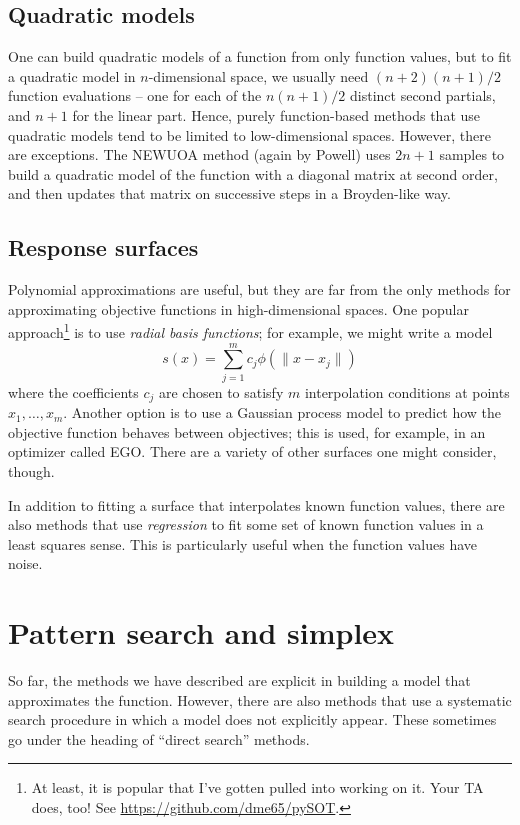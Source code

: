 \documentclass[12pt, leqno]{article} %
\begin{document}
\subsection{Quadratic models}

One can build quadratic models of a function from only function
values, but to fit a quadratic model in $n$-dimensional space, we
usually need $(n+2)(n+1)/2$ function evaluations -- one for each of
the $n(n+1)/2$ distinct second partials, and $n+1$ for the linear
part.  Hence, purely function-based methods that use quadratic models
tend to be limited to low-dimensional spaces.  However, there are
exceptions.  The NEWUOA method (again by Powell) uses $2n+1$ samples
to build a quadratic model of the function with a diagonal matrix at
second order, and then updates that matrix on successive steps in a
Broyden-like way.

\subsection{Response surfaces}

Polynomial approximations are useful, but they are far from the only
methods for approximating objective functions in high-dimensional
spaces.  One popular approach\footnote{%
At least, it is popular that I've gotten pulled into working on it.
Your TA does, too!  See \url{https://github.com/dme65/pySOT}.  
} is to use {\em radial basis functions};
for example, we might write a model
\[
  s(x) = \sum_{j=1}^m c_j \phi(\|x-x_j\|)
\]
where the coefficients $c_j$ are chosen to satisfy $m$ interpolation
conditions at points $x_1, \ldots, x_m$.  Another option is to use
a Gaussian process model to predict how the objective function behaves
between objectives; this is used, for example, in an optimizer called
EGO.  There are a variety of other surfaces one might consider, though.

In addition to fitting a surface that interpolates known function
values, there are also methods that use {\em regression} to fit
some set of known function values in a least squares sense.
This is particularly useful when the function values have noise.

\section{Pattern search and simplex}

So far, the methods we have described are explicit in building a model
that approximates the function.  However, there are also methods that
use a systematic search procedure in which a model does not explicitly
appear.  These sometimes go under the heading of ``direct search''
methods.
\end{document}
